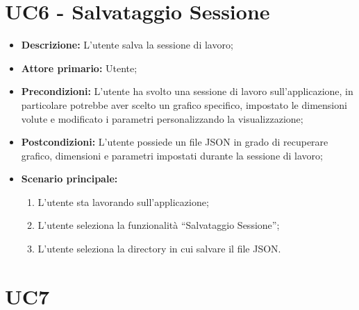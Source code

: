 
\section{UC6 - Salvataggio Sessione}

\begin{itemize}
  \item \textbf{Descrizione:} L'utente salva la sessione di lavoro;
  \item \textbf{Attore primario:} Utente;
  \item \textbf{Precondizioni:} L'utente ha svolto una sessione di lavoro sull'applicazione, in particolare potrebbe aver scelto un grafico specifico, impostato le dimensioni volute e modificato i parametri personalizzando la visualizzazione;
  \item \textbf{Postcondizioni:} L'utente possiede un file JSON in grado di recuperare grafico, dimensioni e parametri impostati durante la sessione di lavoro;
  \item \textbf{Scenario principale:}
  \begin{enumerate}
    \item L'utente sta lavorando sull'applicazione;
    \item L'utente seleziona la funzionalità ``Salvataggio Sessione'';
    \item L'utente seleziona la directory in cui salvare il file JSON.
  \end{enumerate}
\end{itemize}

\section{UC7}
